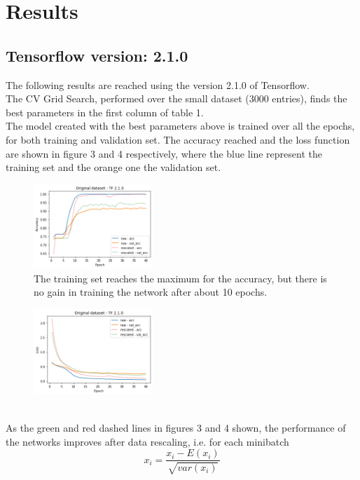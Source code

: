 \documentclass[prl,twocolumn]{revtex4-1}
\begin{document}
\section{Results}
\subsection{Tensorflow version:  2.1.0}
The following results are reached using the version 2.1.0 of Tensorflow.\\
The CV Grid Search, performed over the small dataset (3000 entries), finds the best parameters in the first column of table 1.\\
The model created with the best parameters above is trained over all the epochs, for both training and validation set. The accuracy reached and the loss function are shown in figure 3 and 4 respectively, where the blue line represent the training set and the orange one the validation set.
\begin{figure}[h]
	\includegraphics[width=0.40\textwidth]{small_newTF.png}
	\caption{The training set reaches the maximum for the accuracy, but there is no gain in training the network after about 10 epochs.}
	\label{fig:y}
\end{figure}
\begin{figure}[h!!!]
	\includegraphics[width=0.40\textwidth]{small_newTFloss.png}
	\caption{}
	\label{fig:y}
\end{figure}
\\
As the green and red dashed lines in figures 3 and 4 shown, the performance of the networks improves after data rescaling, i.e. for each minibatch
\begin{equation}
x_{i} = \frac{x_{i}-E(x_{i})}{\sqrt{var(x_{i})}} 
\end{equation}
\end{document}
